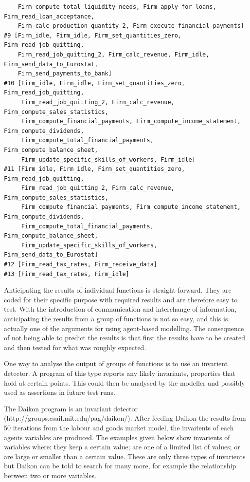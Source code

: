 {\begin{verbatim}
    Firm_compute_total_liquidity_needs, Firm_apply_for_loans, Firm_read_loan_acceptance,
    Firm_calc_production_quantity_2, Firm_execute_financial_payments]
#9 [Firm_idle, Firm_idle, Firm_set_quantities_zero, Firm_read_job_quitting,
    Firm_read_job_quitting_2, Firm_calc_revenue, Firm_idle, Firm_send_data_to_Eurostat,
    Firm_send_payments_to_bank]
#10 [Firm_idle, Firm_idle, Firm_set_quantities_zero, Firm_read_job_quitting,
     Firm_read_job_quitting_2, Firm_calc_revenue, Firm_compute_sales_statistics,
     Firm_compute_financial_payments, Firm_compute_income_statement, Firm_compute_dividends,
     Firm_compute_total_financial_payments, Firm_compute_balance_sheet,
     Firm_update_specific_skills_of_workers, Firm_idle]
#11 [Firm_idle, Firm_idle, Firm_set_quantities_zero, Firm_read_job_quitting,
     Firm_read_job_quitting_2, Firm_calc_revenue, Firm_compute_sales_statistics,
     Firm_compute_financial_payments, Firm_compute_income_statement, Firm_compute_dividends,
     Firm_compute_total_financial_payments, Firm_compute_balance_sheet, 
     Firm_update_specific_skills_of_workers, Firm_send_data_to_Eurostat]
#12 [Firm_read_tax_rates, Firm_receive_data]
#13 [Firm_read_tax_rates, Firm_idle]
\end{verbatim}
}

Anticipating the results of individual functions is straight forward. They are
coded for their specific purpose with required results and are therefore easy to
test. With the introduction of communication and interchange of information,
anticipating the results from a group of functions is not so easy, and this is
actually one of the arguments for using agent-based modelling. The consequence
of not being able to predict the results is that first the results have to be created
and then tested for what was roughly expected.

One way to analyse the output of groups of functions is to use an invarient
detector. A program of this type reports any likely invariants, properties that
hold at certain points. This could then be analysed by the modeller and possibly
used as assertions in future test runs.

The Daikon program is an invariant detector \cite{DAIKON:2007}
(http://groups.csail.mit.edu/pag/daikon/). After feeding Daikon the results
from 50 iterations from the labour and goods market model, the invarients
of each agents variables are produced. The examples given below show invarients
of variables where: they keep a certain value; are one of a limited list of
values; or are large or smaller than a certain value. These are only three
types of invarients but Daikon can be told to search for many more, for example
the relationship between two or more variables.


